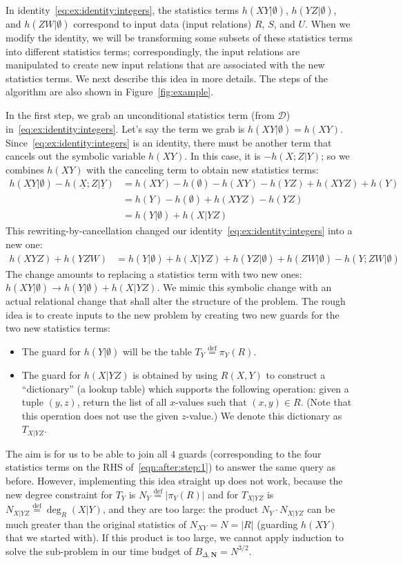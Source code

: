 \documentclass{theoretics}
\newcommand{\calD}{\mathcal D}
\newcommand{\defeq}{\stackrel{\text{def}}{=}}
\begin{document}
In identity~\eqref{eq:ex:identity:integers}, the statistics terms
$h(XY|\emptyset)$, $h(YZ|\emptyset)$, and $h(ZW|\emptyset)$ correspond to input data
(input relations) $R$, $S$, and $U$.
When we modify the identity, we will be transforming some subsets of these statistics
terms into different statistics terms; correspondingly, the input relations are
manipulated to create new input relations that are associated with the new statistics
terms.
We next describe this idea in more details.
The steps of the algorithm are also shown in Figure~\ref{fig:example}.

In the first step, we grab an unconditional statistics term (from $\calD$)
in~\eqref{eq:ex:identity:integers}. Let's say the term we grab is $h(XY |\emptyset)=h(XY)$.
Since~\eqref{eq:ex:identity:integers} is an identity, there must be another term that
cancels out the symbolic variable $h(XY)$. In this case, it is $-h(X;Z|Y)$; so we combines
$h(XY)$ with the canceling term to obtain new statistics terms:
%
\begin{align*}
  h(\underline{XY}|\emptyset) - h(\underline{X};Z|\underline{Y}) &=
  h(XY)-h(\emptyset)-h(XY)-h(YZ)+h(XYZ)+h(Y)\\
  &=h(Y) - h(\emptyset)+ h(XYZ)-h(YZ)\\
  &=h(Y|\emptyset)+h(X|YZ)
\end{align*}
%
This rewriting-by-cancellation changed our identity~\eqref{eq:ex:identity:integers} into a new one:
%
\begin{align} \label{eqn:after:step:1}
  h(XYZ)+h(YZW) &= h(Y|\emptyset)+h(X|YZ)+h(YZ|\emptyset)+h(ZW|\emptyset) - h(Y;ZW|\emptyset)
\end{align}
%
The change amounts to replacing a statistics term with two new ones:
$h(XY|\emptyset) \to h(Y|\emptyset)+h(X|YZ)$.
We mimic this symbolic change with an actual relational change that shall alter the
structure of the problem.
The rough idea is to create inputs to the new problem by creating two new guards for the two new
statistics terms:
\begin{itemize}
\item The guard for $h(Y|\emptyset)$ will be the table $T_Y \defeq \pi_Y(R)$.
\item The guard for $h(X|YZ)$ is obtained by using $R(X,Y)$ to construct a ``dictionary''
(a lookup table) which supports the following operation: given
a tuple $(y, z)$, return the list of all $x$-values such that $(x, y) \in R$.
(Note that this operation does not use the given $z$-value.)
We denote this dictionary as $T_{X|YZ}$.
\end{itemize}
The aim is for us to be able to join all $4$ guards (corresponding to the four statistics
terms on the RHS of~\eqref{eqn:after:step:1}) to answer the same query as before.
However, implementing this idea straight up does not work, because the new degree constraint
for $T_Y$ is $N_Y \defeq |\pi_Y(R)|$ and for $T_{X|YZ}$ is $N_{X|YZ} \defeq\deg_R(X|Y)$, and they are too
large: the product $N_Y \cdot N_{X|YZ}$ can be much greater than the original statistics
of $N_{XY} = N = |R|$ (guarding $h(XY)$ that we started with).
If this product is too large, we cannot apply induction to solve the sub-problem in our time budget of $B_{\Delta, \bm N} = N^{3/2}$.
\end{document}
